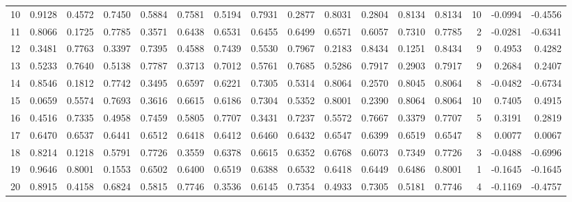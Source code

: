 \begin{tabular}{lrrrrrrrrrrrrrrr}
10  &      0.9128 &  0.4572 &  0.7450 &  0.5884 &  0.7581 &  0.5194 &  0.7931 &  0.2877 &  0.8031 &  0.2804 &   0.8134 &     0.8134 &     10 &                   -0.0994 &                    -0.4556 \\
11  &      0.8066 &  0.1725 &  0.7785 &  0.3571 &  0.6438 &  0.6531 &  0.6455 &  0.6499 &  0.6571 &  0.6057 &   0.7310 &     0.7785 &      2 &                   -0.0281 &                    -0.6341 \\
12  &      0.3481 &  0.7763 &  0.3397 &  0.7395 &  0.4588 &  0.7439 &  0.5530 &  0.7967 &  0.2183 &  0.8434 &   0.1251 &     0.8434 &      9 &                    0.4953 &                     0.4282 \\
13  &      0.5233 &  0.7640 &  0.5138 &  0.7787 &  0.3713 &  0.7012 &  0.5761 &  0.7685 &  0.5286 &  0.7917 &   0.2903 &     0.7917 &      9 &                    0.2684 &                     0.2407 \\
14  &      0.8546 &  0.1812 &  0.7742 &  0.3495 &  0.6597 &  0.6221 &  0.7305 &  0.5314 &  0.8064 &  0.2570 &   0.8045 &     0.8064 &      8 &                   -0.0482 &                    -0.6734 \\
15  &      0.0659 &  0.5574 &  0.7693 &  0.3616 &  0.6615 &  0.6186 &  0.7304 &  0.5352 &  0.8001 &  0.2390 &   0.8064 &     0.8064 &     10 &                    0.7405 &                     0.4915 \\
16  &      0.4516 &  0.7335 &  0.4958 &  0.7459 &  0.5805 &  0.7707 &  0.3431 &  0.7237 &  0.5572 &  0.7667 &   0.3379 &     0.7707 &      5 &                    0.3191 &                     0.2819 \\
17  &      0.6470 &  0.6537 &  0.6441 &  0.6512 &  0.6418 &  0.6412 &  0.6460 &  0.6432 &  0.6547 &  0.6399 &   0.6519 &     0.6547 &      8 &                    0.0077 &                     0.0067 \\
18  &      0.8214 &  0.1218 &  0.5791 &  0.7726 &  0.3559 &  0.6378 &  0.6615 &  0.6352 &  0.6768 &  0.6073 &   0.7349 &     0.7726 &      3 &                   -0.0488 &                    -0.6996 \\
19  &      0.9646 &  0.8001 &  0.1553 &  0.6502 &  0.6400 &  0.6519 &  0.6388 &  0.6532 &  0.6418 &  0.6449 &   0.6486 &     0.8001 &      1 &                   -0.1645 &                    -0.1645 \\
20  &      0.8915 &  0.4158 &  0.6824 &  0.5815 &  0.7746 &  0.3536 &  0.6145 &  0.7354 &  0.4933 &  0.7305 &   0.5181 &     0.7746 &      4 &                   -0.1169 &                    -0.4757 \\

\end{tabular}
